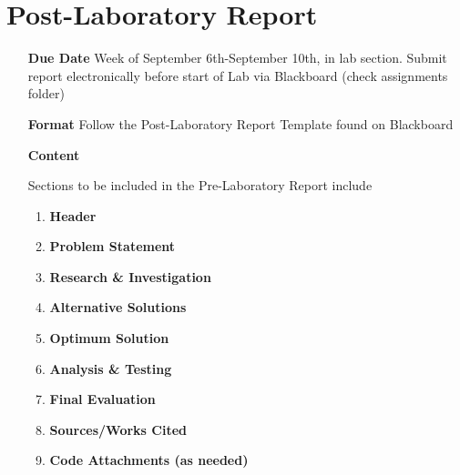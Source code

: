 \documentclass[]{report}
\begin{document}
\section{Post-Laboratory Report}

\begin{itemize}
	\item[\textbf{Due Date}]{Week of September 6th-September 10th, \the\year \space in lab section. Submit report electronically before start of Lab via Blackboard (check assignments folder)}
	\item[\textbf{Format}]{Follow the Post-Laboratory Report Template found on Blackboard}
	\item[\textbf{Content}]{Sections to be included in the Pre-Laboratory Report include
		\begin{enumerate}
			\item \textbf{Header}
			\item \textbf{Problem Statement}
			\item \textbf{Research \& Investigation}
			\item \textbf{Alternative Solutions}
			\item \textbf{Optimum Solution}
			\item \textbf{Analysis \& Testing}
			\item \textbf{Final Evaluation}
			\item \textbf{Sources/Works Cited}
			\item \textbf{Code Attachments (as needed)}
		\end{enumerate}
		
	}
\end{itemize}
\end{document}

